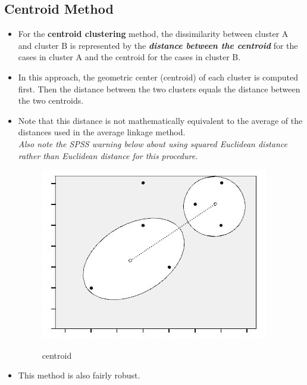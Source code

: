 \documentclass[a4paper,12pt]{article}
\begin{document}
\subsection{Centroid Method}
\begin{itemize}
	\item For the \textbf{centroid clustering} method, the dissimilarity between cluster A and cluster B is represented by the \textbf{\textit{distance between the centroid}} for the cases in cluster A and the centroid for the cases in cluster B.  
	\item  In this approach, the geometric center (centroid) of each cluster is
	computed first. Then the distance between the two clusters equals the distance between
	the two centroids.
	\item Note that this distance is not mathematically equivalent to the average of the distances used in the average linkage method. \\ \textit{Also note the SPSS warning below about using squared Euclidean distance rather than Euclidean distance for this procedure}.

	\begin{figure}[h!]
		\begin{center}
			\includegraphics[scale=0.4]{images/Link4.jpg}\\
			\caption{centroid}
		\end{center}
	\end{figure}
	\item This method is also fairly robust. 
\end{itemize}
\end{document}

